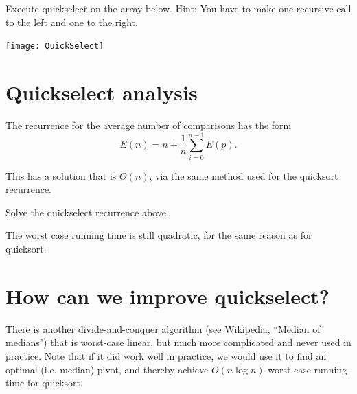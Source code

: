 \begin{Boxample}[1]
Execute quickselect on the array below. Hint: You have to make one recursive call to the left and one to the right.
\begin{center}
\texttt{[image: QuickSelect]} 
\end{center}
\end{Boxample}


\section{Quickselect analysis}
The recurrence for the average number of comparisons has the form 
$$E(n) = n + \frac{1}{n} \sum_{i=0}^{n-1} E(p)\text{.}$$

This has a solution that is $\Theta(n)$, via the same method used for the quicksort recurrence.

\begin{Boxample}[6]
Solve the quickselect recurrence above.
\end{Boxample}

The worst case running time is still quadratic, for the same reason as for quicksort.

\section{How can we improve quickselect?}
There is another divide-and-conquer algorithm (see Wikipedia, ``Median of medians") that is worst-case linear, 
but much more complicated and never used in practice. 
Note that if it did work well in practice, we would use it to find an optimal (i.e. median) pivot, 
and thereby achieve $O(n\log n)$ worst case running time for quicksort.


